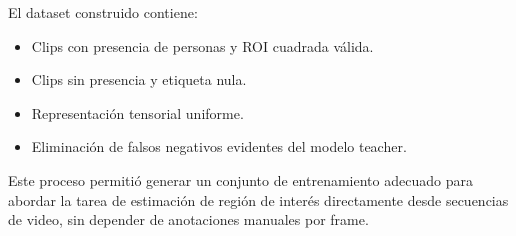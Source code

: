 \documentclass[12pt,a4paper]{article}
\begin{document}
El dataset construido contiene:

\begin{itemize}
    \item Clips con presencia de personas y ROI cuadrada válida.
    \item Clips sin presencia y etiqueta nula.
    \item Representación tensorial uniforme.
    \item Eliminación de falsos negativos evidentes del modelo teacher.
\end{itemize}

Este proceso permitió generar un conjunto de entrenamiento adecuado para abordar la tarea de estimación de región de interés directamente desde secuencias de video, sin depender de anotaciones manuales por frame.
\end{document}
